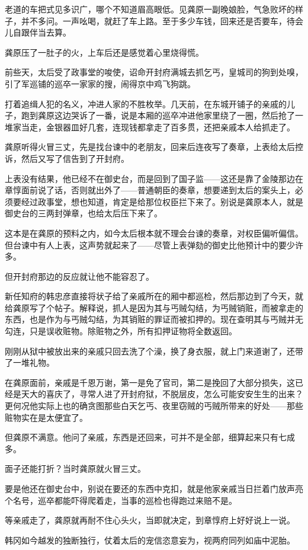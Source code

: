 老道的车把式见多识广，哪个不知道眉高眼低。见龚原一副晚娘脸，气急败坏的样子，并不多问。一声吆喝，就赶了车上路。至于多少车钱，回来还是否要车，待会儿自跟伴当去算。

龚原压了一肚子的火，上车后还是感觉着心里烧得慌。

前些天，太后受了政事堂的唆使，诏命开封府满城去抓乞丐，皇城司的狗到处嗅，引了军巡铺的巡卒一家家的搜，闹得京中鸡飞狗跳。

打着追缉人犯的名义，冲进人家的不胜枚举。几天前，在东城开铺子的亲戚的儿子，跑到龚原这边哭诉了一番，说是本厢的巡卒冲进他家里绕了一圈，然后抢了一堆家当走，金银器皿好几套，连现钱都拿走了百多贯，还把亲戚本人给抓走了。

龚原听得火冒三丈，先是找台谏中的老朋友，回来后连夜写了奏章，上表给太后控诉，然后又写了信告到了开封府。

上表没有结果，他已经不在御史台，而是回到了国子监——这还是靠了金陵那边在章惇面前说了话，否则就出外了——普通朝臣的奏章，想要递到太后的案头上，必须要经过政事堂，想也知道，肯定是给那位权臣拦下来了。别说是龚原本人，就是御史台的三两封弹章，也给太后压下来了。

这本是在龚原的预料之内，如今太后根本就不理会台谏的奏章，对权臣偏听偏信。但台谏中有人上表，这声势就起来了——尽管上表弹劾的御史比他预计中的要少许多。

但开封府那边的反应就让他不能容忍了。

新任知府的韩忠彦直接将状子给了亲戚所在的厢中都巡检，然后那边到了今天，就给龚原写了个帖子。解释说，抓人是因为其与丐贼勾结，为丐贼销赃，而被拿走的东西，也是作为与丐贼勾结，为其销赃的罪证而被扣押的。现在查明其与丐贼并无勾连，只是误收赃物。除赃物之外，所有扣押证物将全数返回。

刚刚从狱中被放出来的亲戚只回去洗了个澡，换了身衣服，就上门来道谢了，还带了一堆礼物。

在龚原面前，亲戚是千恩万谢，第一是免了官司，第二是挽回了大部分损失，这已经是天大的喜庆了，寻常人进了开封府狱，不脱层皮，怎么可能安安生生的出来？更何况他实际上也的确贪图那些白天乞丐、夜里窃贼的丐贼所带来的好处——那些赃物实在是太便宜了。

但龚原不满意。他问了亲戚，东西是还回来，可并不是全部，细算起来只有七成多。

面子还能打折？当时龚原就火冒三丈。

要是他还在御史台中，别说在要还的东西中克扣，就是他家亲戚当日拦着门放声亮个名号，巡卒都能吓得爬着走，当事的巡检也得跑过来赔不是。

等亲戚走了，龚原就再耐不住心头火，当即就决定，到章惇府上好好说上一说。

韩冈如今越发的独断独行，仗着太后的宠信恣意妄为，视两府同列如庙中泥胎。

